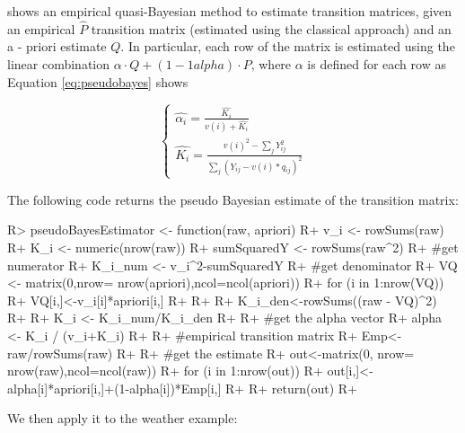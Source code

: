 \documentclass[
  nojss]{jss}
\begin{document}
\cite{Hu2002} shows an empirical quasi-Bayesian method to estimate transition matrices, given an empirical \(\hat{P}\) transition matrix (estimated using the classical approach) and an a - priori estimate \(Q\). In particular, each row of the matrix is estimated using the linear combination \(\alpha \cdot Q+\left(1-1alpha\right) \cdot P\), where \(\alpha\) is defined for each row as Equation \ref{eq:pseudobayes} shows

\begin{equation}
\left\{\begin{matrix}
\hat{\alpha_i}=\frac{\hat{K_i}}{v\left(i \right )+\hat{K_i}}\\ 
\hat{K_i}=\frac{v\left(i \right)^2 - \sum_{j}Y_{ij}^2}{\sum_{j}(Y_{ij}-v\left(i \right)*q_{ij})^2}
\end{matrix}\right.
\label{eq:pseudobayes}
\end{equation}

The following code returns the pseudo Bayesian estimate of the transition matrix:

\begin{CodeChunk}

\begin{CodeInput}
R> pseudoBayesEstimator <- function(raw, apriori){
R+   v_i <- rowSums(raw) 
R+   K_i <- numeric(nrow(raw))
R+   sumSquaredY <- rowSums(raw^2)
R+   #get numerator
R+   K_i_num <- v_i^2-sumSquaredY
R+   #get denominator
R+   VQ <- matrix(0,nrow= nrow(apriori),ncol=ncol(apriori))
R+   for (i in 1:nrow(VQ)) {
R+     VQ[i,]<-v_i[i]*apriori[i,]
R+   }
R+   
R+   K_i_den<-rowSums((raw - VQ)^2)
R+   
R+   K_i <- K_i_num/K_i_den
R+   
R+   #get the alpha vector
R+   alpha <- K_i / (v_i+K_i)
R+   
R+   #empirical transition matrix
R+   Emp<-raw/rowSums(raw)
R+   
R+   #get the estimate
R+   out<-matrix(0, nrow= nrow(raw),ncol=ncol(raw))
R+   for (i in 1:nrow(out)) {
R+     out[i,]<-alpha[i]*apriori[i,]+(1-alpha[i])*Emp[i,]
R+   }
R+   return(out)
R+ }
\end{CodeInput}
\end{CodeChunk}

We then apply it to the weather example:
\end{document}
